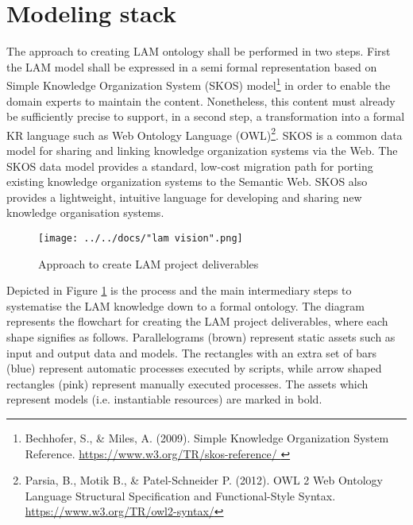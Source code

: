 
\section{Modeling stack}\label{ariaid-title134}

The approach to creating LAM ontology shall be performed in two steps. First the LAM model shall be expressed in a semi formal representation based on Simple Knowledge Organization System (SKOS) model\footnote{Bechhofer, S., \& 	Miles, A. (2009). Simple Knowledge Organization System Reference.  \url{https://www.w3.org/TR/skos-reference/ }} in order to enable the domain experts to maintain the content. Nonetheless, this content must already be sufficiently precise to support, in a second step, a transformation into a formal KR language such as Web Ontology Language (OWL)\footnote{Parsia, B., Motik B.,  \& Patel-Schneider P. (2012). OWL 2 Web Ontology Language Structural Specification and Functional-Style Syntax. \url{https://www.w3.org/TR/owl2-syntax/}}. SKOS is a common data model for sharing and linking knowledge organization systems via the Web. The SKOS data model provides a standard, low-cost migration path for porting existing knowledge organization systems to the Semantic Web. SKOS also provides a lightweight, intuitive language for developing and sharing new knowledge organisation systems.

\begin{figure}[!ht]
	\centering
	\texttt{[image: ../../docs/"lam vision".png]}
	\caption{Approach to create LAM project deliverables}
	\label{fig:process-fig}
\end{figure}


Depicted in Figure \ref{fig:process-fig} is the process and the main intermediary steps to systematise the LAM knowledge down to a formal ontology. The diagram represents the flowchart for creating the LAM project deliverables, where each shape signifies as follows. Parallelograms (brown) represent static assets such as input and output data and models. The rectangles with an extra set of bars (blue) represent automatic processes executed by scripts, while arrow shaped rectangles (pink) represent manually executed processes. The assets which represent models (i.e. instantiable resources) are marked in bold. 


